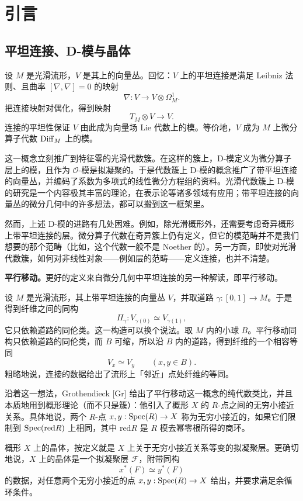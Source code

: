 \chapter*{引言}

\section{平坦连接、D-模与晶体}

设 $M$ 是光滑流形，$V$ 是其上的向量丛。回忆：$V$ 上的平坦连接是满足 Leibniz 法则、且曲率 $[\nabla,\nabla]=0$ 的映射
\[
\nabla:V\to V\otimes\Omega^1_M .
\]
把连接映射对偶化，得到映射
\[
T_M\otimes V\to V .
\]
连接的平坦性保证 $V$ 由此成为向量场 Lie 代数上的模。等价地，$V$ 成为 $M$ 上微分算子代数 $\mathrm{Diff}_M$ 上的模。

这一概念立刻推广到特征零的光滑代数簇。在这样的簇上，D-模定义为微分算子层上的模，且作为 $\mathcal{O}$-模是拟凝聚的。于是代数簇上 D-模的概念推广了带平坦连接的向量丛，并编码了系数为多项式的线性微分方程组的资料。光滑代数簇上 D-模的研究是一个内容极其丰富的理论，在表示论等诸多领域有应用；带平坦连接的向量丛的微分几何中的许多想法，都可以搬到这一框架里。

然而，上述 D-模的进路有几处困难。例如，除光滑概形外，还需要考虑奇异概形上带平坦连接的层。微分算子代数在奇异簇上仍有定义，但它的模范畴并不是我们想要的那个范畴（比如，这个代数一般不是 Noether 的）。另一方面，即使对光滑代数簇，如何对非线性对象——例如层的范畴——定义连接，也并不清楚。

\textbf{平行移动。}更好的定义来自微分几何中平坦连接的另一种解读，即平行移动。

设 $M$ 是光滑流形，其上带平坦连接的向量丛 $V$，并取道路 $\gamma:[0,1]\to M$。于是得到纤维之间的同构
\[
\Pi_\gamma:V_{\gamma(0)}\simeq V_{\gamma(1)},
\]
它只依赖道路的同伦类。这一构造可以换个说法。取 $M$ 内的小球 $B$。平行移动同构只依赖道路的同伦类，而 $B$ 可缩，所以沿 $B$ 内的道路，得到纤维的一个相容等同
\[
V_x\simeq V_y\qquad (x,y\in B).
\]
粗略地说，连接的数据给出了流形上「邻近」点处纤维的等同。

沿着这一想法，Grothendieck [Gr] 给出了平行移动这一概念的纯代数类比，并且本质地用到概形理论（而不只是簇）：他引入了概形 $X$ 的 $R$-点之间的无穷小接近关系。具体地说，两个 $R$-点 $x,y:\mathrm{Spec}(R)\to X$ 称为无穷小接近的，如果它们限制到 $\mathrm{Spec}(\mathrm{red}R)$ 上相同，其中 $\mathrm{red}R$ 是 $R$ 模去幂零根所得的商环。

概形 $X$ 上的晶体，按定义就是 $X$ 上关于无穷小接近关系等变的拟凝聚层。更确切地说，$X$ 上的晶体是一个拟凝聚层 $\mathcal{F}$，附带同构
\[
x^*(F)\simeq y^*(F)
\]
的数据，对任意两个无穷小接近的点 $x,y:\mathrm{Spec}(R)\to X$ 给出，并要求满足余循环条件。

